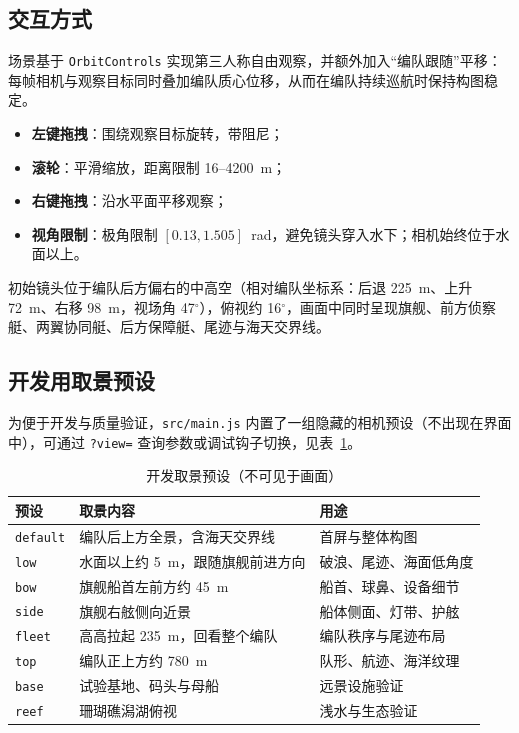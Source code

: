 \documentclass[UTF8, a4paper, 11pt]{ctexart}
\newcommand{\file}[1]{\texttt{#1}}
\begin{document}
\subsection{交互方式}

场景基于 \texttt{OrbitControls} 实现第三人称自由观察，并额外加入“编队跟随”平移：每帧相机与观察目标同时叠加编队质心位移，从而在编队持续巡航时保持构图稳定。

\begin{itemize}
  \item \textbf{左键拖拽}：围绕观察目标旋转，带阻尼；
  \item \textbf{滚轮}：平滑缩放，距离限制 16--4200~m；
  \item \textbf{右键拖拽}：沿水平面平移观察；
  \item \textbf{视角限制}：极角限制 $[0.13, 1.505]$~rad，避免镜头穿入水下；相机始终位于水面以上。
\end{itemize}

初始镜头位于编队后方偏右的中高空（相对编队坐标系：后退 225~m、上升 72~m、右移 98~m，视场角 47$^\circ$），俯视约 16$^\circ$，画面中同时呈现旗舰、前方侦察艇、两翼协同艇、后方保障艇、尾迹与海天交界线。

\subsection{开发用取景预设}

为便于开发与质量验证，\file{src/main.js} 内置了一组隐藏的相机预设（不出现在界面中），可通过 \file{?view=} 查询参数或调试钩子切换，见表~\ref{tab:views}。

\begin{table}[H]
\centering
\caption{开发取景预设（不可见于画面）}
\label{tab:views}
\small
\begin{tabular}{@{}lll@{}}
\toprule
\textbf{预设} & \textbf{取景内容} & \textbf{用途} \\
\midrule
\file{default} & 编队后上方全景，含海天交界线 & 首屏与整体构图 \\
\file{low} & 水面以上约 5~m，跟随旗舰前进方向 & 破浪、尾迹、海面低角度 \\
\file{bow} & 旗舰船首左前方约 45~m & 船首、球鼻、设备细节 \\
\file{side} & 旗舰右舷侧向近景 & 船体侧面、灯带、护舷 \\
\file{fleet} & 高高拉起 235~m，回看整个编队 & 编队秩序与尾迹布局 \\
\file{top} & 编队正上方约 780~m & 队形、航迹、海洋纹理 \\
\file{base} & 试验基地、码头与母船 & 远景设施验证 \\
\file{reef} & 珊瑚礁潟湖俯视 & 浅水与生态验证 \\
\bottomrule
\end{tabular}
\end{table}
\end{document}
